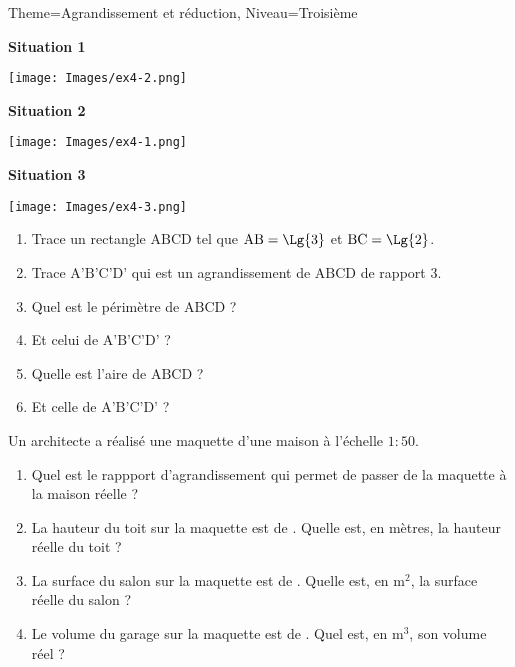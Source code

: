 \documentclass[11pt]{article}
\begin{document}
\begin{Maquette}[Fiche]{Theme=Agrandissement et réduction, Niveau=Troisième}
\begin{multicols}{2}
\begin{exercice}
         \textbf{Situation 1}
         \begin{center}
            \texttt{[image: Images/ex4-2.png]}
         \end{center}

         \textbf{Situation 2}
         \begin{center}
            \texttt{[image: Images/ex4-1.png]}
         \end{center}

         \textbf{Situation 3}
         \begin{center}
            \texttt{[image: Images/ex4-3.png]}
         \end{center}
      \end{exercice}
      \columnbreak
      \begin{exercice}
         \begin{enumerate}
            \item Trace un rectangle $\textrm{ABCD}$ tel que $\textrm{AB} = \Lg{3}$ et $\textrm{BC} = \Lg{2}$.
            \item Trace $\textrm{A’B’C’D’}$ qui est un agrandissement de $\textrm{ABCD}$ de rapport $3$.
            \item Quel est le périmètre de $\textrm{ABCD}$ ?
            \item[] Et celui de $\textrm{A’B’C’D’}$ ?
            \item Quelle est l’aire de $\textrm{ABCD}$ ?
            \item[] Et celle de $\textrm{A’B’C’D’}$ ?
         \end{enumerate}
      \end{exercice}
      
      \begin{exercice}
         Un architecte a réalisé une maquette d’une maison à l’échelle $1:50$.
         \begin{enumerate}
            \item Quel est le rappport d’agrandissement qui permet de passer de la maquette à la maison réelle ?
            \item La hauteur du toit sur la maquette est de . Quelle est, en mètres, la hauteur réelle du toit ?
            \item La surface du salon sur la maquette est de . Quelle est, en $\textrm{m}^2$, la surface réelle du salon ?
            \item Le volume du garage sur la maquette est de . Quel est, en $\textrm{m}^3$, son volume réel ?
         \end{enumerate}


\end{exercice}
\end{multicols}
\end{Maquette}
\end{document}
